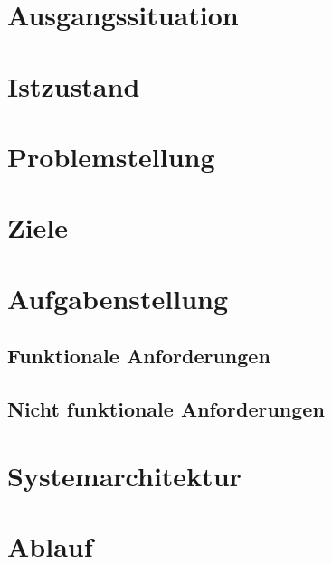 \section{Ausgangssituation}
\section{Istzustand}
\section{Problemstellung}
\section{Ziele}
\section{Aufgabenstellung}
\subsection{Funktionale Anforderungen}
\subsection{Nicht funktionale Anforderungen}
\section{Systemarchitektur}
\section{Ablauf}